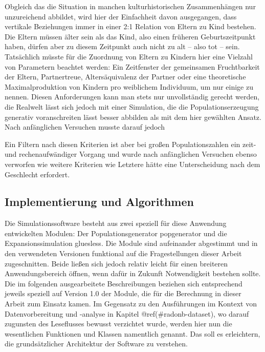 \documentclass[openany,twoside,twocolumn]{book}
\begin{document}
Obgleich das die Situation in manchen kulturhistorischen Zusammenhängen
nur unzureichend abbildet, wird hier der Einfachheit davon ausgegangen,
dass vertikale Beziehungen immer in einer 2:1 Relation von Eltern zu
Kind bestehen. Die Eltern müssen älter sein als das Kind, also einen
früheren Geburtszeitpunkt haben, dürfen aber zu diesem Zeitpunkt auch
nicht zu alt -- also tot -- sein. Tatsächlich müsste für die Zuordnung
von Eltern zu Kindern hier eine Vielzahl von Parametern beachtet werden:
Ein Zeitfenster der gemeinsamen Fruchtbarkeit der Eltern, Partnertreue,
Altersäquivalenz der Partner oder eine theoretische Maximalproduktion
von Kindern pro weiblichem Individuum, um nur einige zu nennen. Diesen
Anforderungen kann man stets nur unvollständig gerecht werden, die
Realwelt lässt sich jedoch mit einer Simulation, die die
Populationserzeugung generativ voranschreiten lässt besser abbilden als
mit dem hier gewählten Ansatz. Nach anfänglichen Versuchen musste darauf
jedoch

Ein Filtern nach diesen Kriterien ist aber bei großen Populationszahlen
ein zeit- und rechenaufwändiger Vorgang und wurde nach anfänglichen
Versuchen ebenso verworfen wie weitere Kriterien wie Letztere hätte eine
Unterscheidung nach dem Geschlecht erfordert.

\hypertarget{implementierung-und-algorithmen}{%
\subsection{Implementierung und
Algorithmen}\label{implementierung-und-algorithmen}}

Die Simulationssoftware besteht aus zwei speziell für diese Anwendung
entwickelten Modulen: Der Populationsgenerator popgenerator und die
Expansionssimulation gluesless. Die Module sind aufeinander abgestimmt
und in den verwendeten Versionen funktional auf die Fragestellungen
dieser Arbeit zugeschnitten. Beide ließen sich jedoch relativ leicht für
einen breiteren Anwendungsbereich öffnen, wenn dafür in Zukunft
Notwendigkeit bestehen sollte. Die im folgenden ausgearbeitete
Beschreibungen beziehen sich entsprechend jeweils speziell auf Version
1.0 der Module, die für die Berechnung in dieser Arbeit zum Einsatz
kamen. Im Gegensatz zu den Ausführungen im Kontext von Datenvorbereitung
und -analyse in Kapitel @ref(\#radonb-dataset), wo darauf zugunsten des
Leseflusses bewusst verzichtet wurde, werden hier nun die wesentlichen
Funktionen und Klassen namentlich genannt. Das soll es erleichtern, die
grundsätzlicher Architektur der Software zu verstehen.
\end{document}
